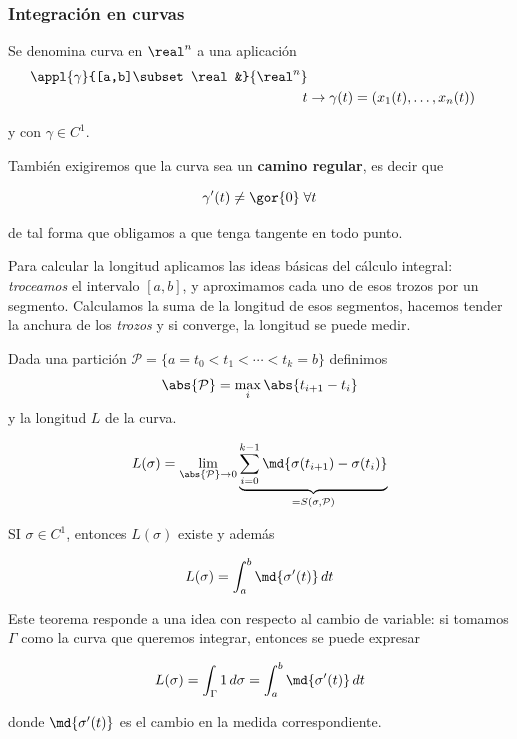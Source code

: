 \subsubsection{Integración en curvas}

\begin{defn}[Curva\IS $C^1$]  Se denomina curva en $\real^n$ a una aplicación \begin{align*}
\appl{\gamma}{[a,b]\subset \real&}{\real^n} \\
t&\to \gamma(t) = (x_1(t),\dotsc,x_n(t))
\end{align*}

y con $\gamma\in C^1$.

También exigiremos que la curva sea un \textbf{camino regular}, es decir que

\[ \gamma'(t) \neq \gor{0} \;\forall t \]

de tal forma que obligamos a que tenga tangente en todo punto.
\end{defn}

Para calcular la longitud aplicamos las ideas básicas del cálculo integral: \textit{troceamos} el intervalo $[a,b]$, y aproximamos cada uno de esos trozos por un segmento. Calculamos la suma de la longitud de esos segmentos, hacemos tender la anchura de los \textit{trozos} y si converge, la longitud se puede medir.

\begin{theorem} Dada una partición $\mathcal{P} = \{ a= t_0 < t_1 < \dotsb < t_k = b\}$ definimos \[ \abs{\mathcal{P}} = \max_i \abs{t_{i+1} - t_i} \] y la longitud $L$ de la curva.

\[ L(\sigma) = \lim_{\abs{\mathcal{P}}\to 0} \underbrace{\sum_{i=0}^{k-1} \md{\sigma(t_{i+1}) - \sigma(t_i)}}_{=S(\sigma,\mathcal{P})} \]

SI $\sigma\in C^1$, entonces $L(\sigma)$ existe y además

\[ L(\sigma) = \int_a^b \md{\sigma'(t)}\,dt \]

\end{theorem}

Este teorema responde a una idea con respecto al cambio de variable: si tomamos $\Gamma$ como la curva que queremos integrar, entonces se puede expresar

\[ L(\sigma) = \int_\Gamma 1\,d\sigma = \int_a^b \md{\sigma'(t)}\,dt  \]

donde $\md{\sigma'(t)}$ es el cambio en la medida correspondiente.

